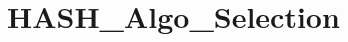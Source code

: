 \hypertarget{group___h_a_s_h___algo___selection}{\section{H\-A\-S\-H\-\_\-\-Algo\-\_\-\-Selection}
\label{group___h_a_s_h___algo___selection}
}
